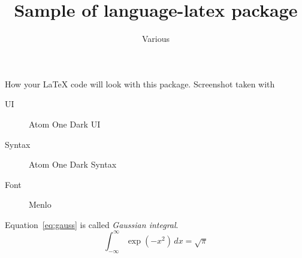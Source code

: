 \documentclass[a4paper]{article}
\title{Sample of language-latex package}
\author{Various}
\begin{document}
How your \LaTeX{} code will look with this package.
Screenshot taken with
\begin{description}
    \item [UI]      Atom One Dark UI
    \item [Syntax]  Atom One Dark Syntax
    \item [Font]    Menlo
\end{description}
Equation~\eqref{eq:gauss} is called \emph{Gaussian integral}.
\begin{equation}
    \int_{-\infty}^{\infty}\exp(-x^2)\,dx = \sqrt{\pi} \label{eq:gauss}
\end{equation}
\end{document}
